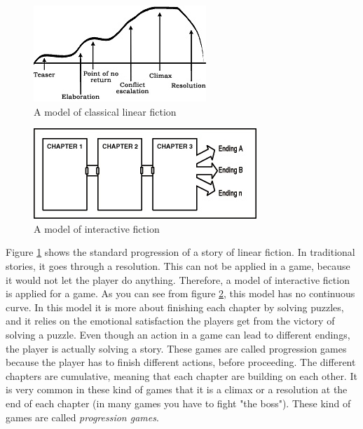 \begin{figure}
\begin{center}
\includegraphics[scale=1.0]{linearFiction}
\caption[Classical Linear Fiction]{A model of classical linear fiction \cite{understandingvg}}
\label{fig:linearfiction}
\end{center}
\end{figure} 
\begin{figure}
\begin{center}
\includegraphics[scale=1.0]{interactiveFiction}
\caption[Interactive Fiction]{A model of interactive fiction \cite{understandingvg}}
\label{fig:interactivefiction}
\end{center}
\end{figure} 

Figure \ref{fig:linearfiction} shows the standard progression of a story of linear fiction. In traditional stories, it goes through a resolution. This can not be applied in a game, because it would not let the player do anything. Therefore, a model of interactive fiction is applied for a game. As you can see from figure \ref{fig:interactivefiction}, this model has no continuous curve. In this model it is more about finishing each chapter by solving puzzles, and it relies on the emotional satisfaction the players get from the victory of solving a puzzle. Even though an action in a game can lead to different endings, the player is actually solving a story. These games are called progression games because the player has to finish different actions, before proceeding. The different chapters are cumulative, meaning that each chapter are building on each other. It is very common in these kind of games that it is a climax or a resolution at the end of each chapter (in many games you have to fight "the boss"). These kind of games are called \emph{progression games}. 

